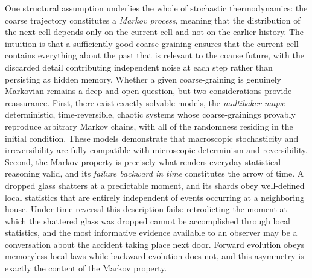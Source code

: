 \documentclass[10pt]{article}
\theoremstyle{definition}
\theoremstyle{remark}
\begin{document}
One structural assumption underlies the whole of stochastic thermodynamics: the coarse trajectory constitutes a \emph{Markov process}, meaning that the distribution of the next cell depends only on the current cell and not on the earlier history. The intuition is that a sufficiently good coarse-graining ensures that the current cell contains everything about the past that is relevant to the coarse future, with the discarded detail contributing independent noise at each step rather than persisting as hidden memory. Whether a given coarse-graining is genuinely Markovian remains a deep and open question, but two considerations provide reassurance. First, there exist exactly solvable models, the \emph{multibaker maps}: deterministic, time-reversible, chaotic systems whose coarse-grainings provably reproduce arbitrary Markov chains, with all of the randomness residing in the initial condition. These models demonstrate that macroscopic stochasticity and irreversibility are fully compatible with microscopic determinism and reversibility. Second, the Markov property is precisely what renders everyday statistical reasoning valid, and its \emph{failure backward in time} constitutes the arrow of time. A dropped glass shatters at a predictable moment, and its shards obey well-defined local statistics that are entirely independent of events occurring at a neighboring house. Under time reversal this description fails: retrodicting the moment at which the shattered glass was dropped cannot be accomplished through local statistics, and the most informative evidence available to an observer may be a conversation about the accident taking place next door. Forward evolution obeys memoryless local laws while backward evolution does not, and this asymmetry is exactly the content of the Markov property.
\end{document}
